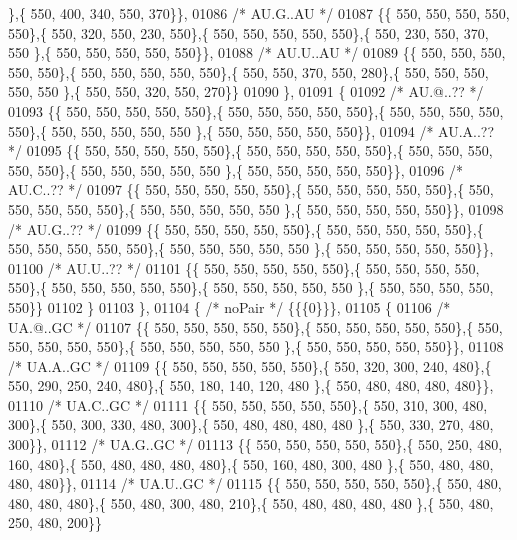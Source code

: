 \begin{DoxyCode}
      \},\{ 550, 400, 340, 550, 370\}\},
01086 \textcolor{comment}{/* AU.G..AU */}
01087 \{\{ 550, 550, 550, 550, 550\},\{ 550, 320, 550, 230, 550\},\{ 550, 550, 550, 550, 550\},\{ 550, 230, 550, 370, 550
      \},\{ 550, 550, 550, 550, 550\}\},
01088 \textcolor{comment}{/* AU.U..AU */}
01089 \{\{ 550, 550, 550, 550, 550\},\{ 550, 550, 550, 550, 550\},\{ 550, 550, 370, 550, 280\},\{ 550, 550, 550, 550, 550
      \},\{ 550, 550, 320, 550, 270\}\}
01090 \},
01091 \{
01092 \textcolor{comment}{/* AU.@..?? */}
01093 \{\{ 550, 550, 550, 550, 550\},\{ 550, 550, 550, 550, 550\},\{ 550, 550, 550, 550, 550\},\{ 550, 550, 550, 550, 550
      \},\{ 550, 550, 550, 550, 550\}\},
01094 \textcolor{comment}{/* AU.A..?? */}
01095 \{\{ 550, 550, 550, 550, 550\},\{ 550, 550, 550, 550, 550\},\{ 550, 550, 550, 550, 550\},\{ 550, 550, 550, 550, 550
      \},\{ 550, 550, 550, 550, 550\}\},
01096 \textcolor{comment}{/* AU.C..?? */}
01097 \{\{ 550, 550, 550, 550, 550\},\{ 550, 550, 550, 550, 550\},\{ 550, 550, 550, 550, 550\},\{ 550, 550, 550, 550, 550
      \},\{ 550, 550, 550, 550, 550\}\},
01098 \textcolor{comment}{/* AU.G..?? */}
01099 \{\{ 550, 550, 550, 550, 550\},\{ 550, 550, 550, 550, 550\},\{ 550, 550, 550, 550, 550\},\{ 550, 550, 550, 550, 550
      \},\{ 550, 550, 550, 550, 550\}\},
01100 \textcolor{comment}{/* AU.U..?? */}
01101 \{\{ 550, 550, 550, 550, 550\},\{ 550, 550, 550, 550, 550\},\{ 550, 550, 550, 550, 550\},\{ 550, 550, 550, 550, 550
      \},\{ 550, 550, 550, 550, 550\}\}
01102 \}
01103 \},
01104 \{ \textcolor{comment}{/* noPair */} \{\{\{0\}\}\},
01105 \{
01106 \textcolor{comment}{/* UA.@..GC */}
01107 \{\{ 550, 550, 550, 550, 550\},\{ 550, 550, 550, 550, 550\},\{ 550, 550, 550, 550, 550\},\{ 550, 550, 550, 550, 550
      \},\{ 550, 550, 550, 550, 550\}\},
01108 \textcolor{comment}{/* UA.A..GC */}
01109 \{\{ 550, 550, 550, 550, 550\},\{ 550, 320, 300, 240, 480\},\{ 550, 290, 250, 240, 480\},\{ 550, 180, 140, 120, 480
      \},\{ 550, 480, 480, 480, 480\}\},
01110 \textcolor{comment}{/* UA.C..GC */}
01111 \{\{ 550, 550, 550, 550, 550\},\{ 550, 310, 300, 480, 300\},\{ 550, 300, 330, 480, 300\},\{ 550, 480, 480, 480, 480
      \},\{ 550, 330, 270, 480, 300\}\},
01112 \textcolor{comment}{/* UA.G..GC */}
01113 \{\{ 550, 550, 550, 550, 550\},\{ 550, 250, 480, 160, 480\},\{ 550, 480, 480, 480, 480\},\{ 550, 160, 480, 300, 480
      \},\{ 550, 480, 480, 480, 480\}\},
01114 \textcolor{comment}{/* UA.U..GC */}
01115 \{\{ 550, 550, 550, 550, 550\},\{ 550, 480, 480, 480, 480\},\{ 550, 480, 300, 480, 210\},\{ 550, 480, 480, 480, 480
      \},\{ 550, 480, 250, 480, 200\}\}

\end{DoxyCode}
